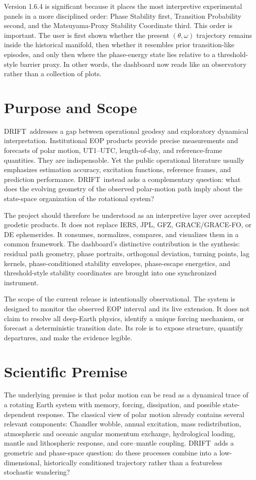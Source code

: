\documentclass[11pt]{article}
\newcommand{\DRIFT}{\textsc{DRIFT}}
\begin{document}
Version 1.6.4 is significant because it places the most interpretive experimental panels in a more disciplined order: Phase Stability first, Transition Probability second, and the Matsuyama-Proxy Stability Coordinate third. This order is important. The user is first shown whether the present \((\theta,\omega)\) trajectory remains inside the historical manifold, then whether it resembles prior transition-like episodes, and only then where the phase-energy state lies relative to a threshold-style barrier proxy. In other words, the dashboard now reads like an observatory rather than a collection of plots.

\section{Purpose and Scope}
\DRIFT\ addresses a gap between operational geodesy and exploratory dynamical interpretation. Institutional EOP products provide precise measurements and forecasts of polar motion, UT1--UTC, length-of-day, and reference-frame quantities. They are indispensable. Yet the public operational literature usually emphasizes estimation accuracy, excitation functions, reference frames, and prediction performance. \DRIFT\ instead asks a complementary question: what does the evolving geometry of the observed polar-motion path imply about the state-space organization of the rotational system?

The project should therefore be understood as an interpretive layer over accepted geodetic products. It does not replace IERS, JPL, GFZ, GRACE/GRACE-FO, or DE ephemerides. It consumes, normalizes, compares, and visualizes them in a common framework. The dashboard's distinctive contribution is the synthesis: residual path geometry, phase portraits, orthogonal deviation, turning points, lag kernels, phase-conditioned stability envelopes, phase-escape energetics, and threshold-style stability coordinates are brought into one synchronized instrument.

The scope of the current release is intentionally observational. The system is designed to monitor the observed EOP interval and its live extension. It does not claim to resolve all deep-Earth physics, identify a unique forcing mechanism, or forecast a deterministic transition date. Its role is to expose structure, quantify departures, and make the evidence legible.

\section{Scientific Premise}
The underlying premise is that polar motion can be read as a dynamical trace of a rotating Earth system with memory, forcing, dissipation, and possible state-dependent response. The classical view of polar motion already contains several relevant components: Chandler wobble, annual excitation, mass redistribution, atmospheric and oceanic angular momentum exchange, hydrological loading, mantle and lithospheric response, and core--mantle coupling. \DRIFT\ adds a geometric and phase-space question: do these processes combine into a low-dimensional, historically conditioned trajectory rather than a featureless stochastic wandering?
\end{document}
